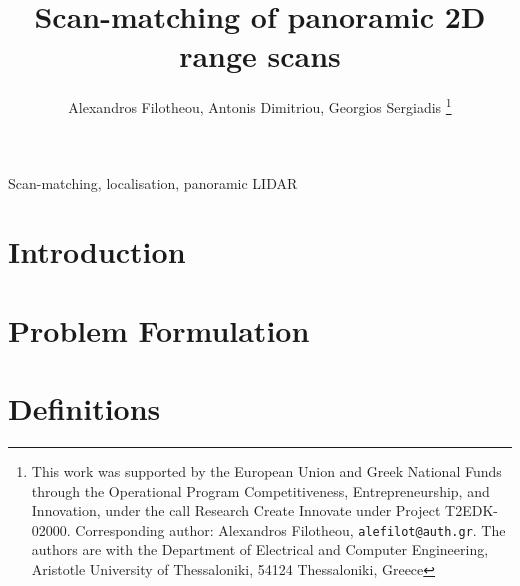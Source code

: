 \documentclass[letterpaper, 10 pt, conference]{ieeeconf}
\begin{document}
\title{\LARGE \bf Scan-matching of panoramic 2D range scans}


\author{Alexandros Filotheou, Antonis Dimitriou, Georgios Sergiadis%
  \thanks{This work was supported by the European Union and Greek National Funds
  through the Operational Program Competitiveness, Entrepreneurship, and
  Innovation, under the call Research Create Innovate under Project T2EDK-02000.
  Corresponding author: Alexandros Filotheou, {\tt\small alefilot@auth.gr}.
  The authors are with the Department of Electrical and Computer Engineering,
  Aristotle University of Thessaloniki, 54124 Thessaloniki, Greece}
}

\maketitle
\thispagestyle{empty}
\pagestyle{empty}


\begin{abstract}
  
\end{abstract}

\begin{keywords}
Scan-matching, localisation, panoramic LIDAR
\end{keywords}

\section{Introduction}
  

\section{Problem Formulation}
  \label{section:the_problem}
  

\section{Definitions}
  \label{section:definitions}
  

\end{document}
